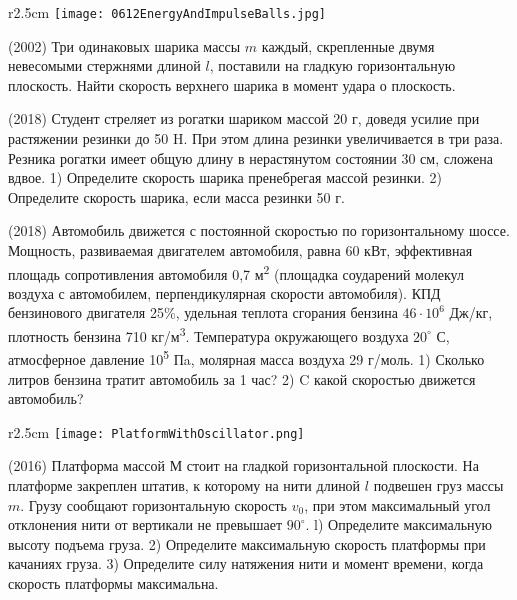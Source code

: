 \begin{wrapfigure}{r}{2.5cm}
\texttt{[image: 0612EnergyAndImpulseBalls.jpg]}
\end{wrapfigure}

\AddProb (2002) Три одинаковых шарика массы $m$ каждый, скрепленные двумя невесомыми стержнями длиной $l$, 
поставили на гладкую горизонтальную плоскость. Найти скорость верхнего шарика в момент удара о плоскость.

\AddProb (2018) Студент стреляет из рогатки шариком массой 20 г, доведя усилие при растяжении резинки до 50 H. При этом длина резинки увеличивается в три раза. Резника рогатки имеет общую длину в нерастянутом состоянии 30 см, сложена вдвое. 1) Определите скорость шарика пренебрегая массой резинки. 2) Определите скорость шарика, если масса резинки 50 г.

\AddProb (2018) Автомобиль движется с постоянной скоростью по горизонтальному шоссе. Мощность, развиваемая двигателем
автомобиля, равна 60 кВт, эффективная площадь сопротивления автомобиля 0,7 м\textsuperscript{2} (площадка соударений молекул воздуха с автомобилем, перпендикулярная скорости автомобиля). КПД бензинового двигателя 25\%, удельная теплота сгорания бензина $46 \cdot 10^6$ Дж/кг, плотность бензина 710 кг/м\textsuperscript{3}. Температура окружающего воздуха $20^{\circ}$ С, атмосферное давление 10\textsuperscript{5} Пa, молярная масса воздуха 29 г/моль. 1) Сколько литров бензина
тратит автомобиль за 1 час? 2) C какой скоростью движется автомобиль?

\begin{wrapfigure}{r}{2.5cm}
\texttt{[image: PlatformWithOscillator.png]}
\end{wrapfigure}
\AddProb (2016) Платформа массой $М$ стоит на гладкой горизонтальной плоскости. На платформе закреплен штатив, к которому на нити длиной $l$ подвешен груз массы $m$. Грузу сообщают горизонтальную скорость $v_0$, при этом максимальный угол отклонения нити от вертикали не превышает $90^{\circ}$. l) Определите максимальную высоту подъема груза. 2) Определите максимальную скорость платформы при качаниях груза. 3) Определите силу натяжения нити и момент времени, когда скорость платформы максимальна.